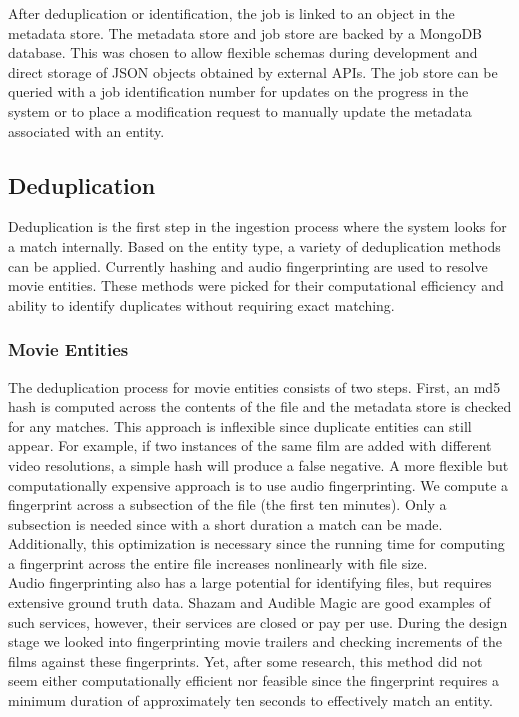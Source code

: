 \documentclass[paper=a4, fontsize=11pt]{scrartcl} %
\numberwithin{equation}{section} %
\numberwithin{figure}{section} %
\numberwithin{table}{section} %
\begin{document}
After deduplication or identification, the job is linked to an object in the metadata store. The metadata store and job store are backed by a MongoDB database. This was chosen to allow flexible schemas during development and direct storage of JSON objects obtained by external APIs. The job store can be queried with a job identification number for updates on the progress in the system or to place a modification request to manually update the metadata associated with an entity. \\


\subsection{Deduplication}
\label{sec:deduplication}
Deduplication is the first step in the ingestion process where the system looks for a match internally. Based on the entity type, a variety of deduplication methods can be applied. Currently hashing and audio fingerprinting are used to resolve movie entities. These methods were picked for their computational efficiency and ability to identify duplicates without requiring exact matching. \\

\subsubsection{Movie Entities}
\label{sec:dedup-movie-entities}
The deduplication process for movie entities consists of two steps. First, an md5 hash is computed across the contents of the file and the metadata store is checked for any matches. This approach is inflexible since duplicate entities can still appear. For example, if two instances of the same film are added with different video resolutions, a simple hash will produce a false negative. A more flexible but computationally expensive approach is to use audio fingerprinting. We compute a fingerprint across a subsection of the file (the first ten minutes). Only a subsection is needed since with a short duration a match can be made. Additionally, this optimization is necessary since the running time for computing a fingerprint across the entire file increases nonlinearly with file size. \\

Audio fingerprinting also has a large potential for identifying files, but requires extensive ground truth data. Shazam and Audible Magic are good examples of such services, however, their services are closed or pay per use. During the design stage we looked into fingerprinting movie trailers and checking increments of the films against these fingerprints. Yet, after some research, this method did not seem either computationally efficient nor feasible since the fingerprint requires a minimum duration of approximately ten seconds to effectively match an entity. \\
\end{document}
